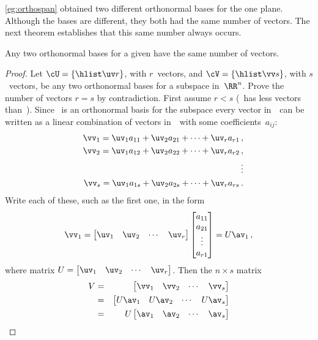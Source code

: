 \autoref{eg:orthospan} obtained two different orthonormal bases for the one plane.  
Although the bases are different, they both had the same number of vectors.
The next theorem establishes that this same number always occurs.

\begin{theorem} \label{thm:sameD} 
Any two orthonormal bases for a given  have the same number of vectors.
\end{theorem}
\begin{proof} 
Let \(\cU=\{\hlist\uv r\}\), with \(r\)~vectors, and \(\cV=\{\hlist\vv s\}\), with \(s\)~vectors, be any two orthonormal bases for a subspace in~\(\RR^n\).
Prove the number of vectors \(r=s\) by contradiction.
First assume \(r<s\) (\cU\ has less vectors than~\cV).
Since \cU\ is an orthonormal basis for the subspace every vector in~\cV\ can be written as a linear combination of vectors in~\cU\ with some coefficients~\(a_{ij}\):
\begin{eqnarray*}
  &&\vv_1=\uv_1a_{11}+\uv_2a_{21}+\cdots+\uv_ra_{r1}\,,
\\&&\vv_2=\uv_1a_{12}+\uv_2a_{22}+\cdots+\uv_ra_{r2}\,,
\\&&\qquad\vdots
\\&&\vv_s=\uv_1a_{1s}+\uv_2a_{2s}+\cdots+\uv_ra_{rs}\,.
\end{eqnarray*}
Write each of these, such as the first one, in the form
\begin{equation*}
\vv_1=\begin{bmatrix} \uv_1&\uv_2&\cdots&\uv_r \end{bmatrix}
\begin{bmatrix} a_{11}\\a_{21}\\\vdots\\a_{r1} \end{bmatrix}
=U\av_1\,,
\end{equation*}
where matrix \(U=\begin{bmatrix} \uv_1&\uv_2&\cdots&\uv_r \end{bmatrix}\).
Then the \(n\times s\) matrix
\begin{eqnarray*}
V&=&\begin{bmatrix} \vv_1&\vv_2&\cdots&\vv_s \end{bmatrix}
\\&=&\begin{bmatrix} U\av_1& U\av_2&\cdots&U\av_s\end{bmatrix}
\\&=&U\begin{bmatrix} \av_1& \av_2&\cdots&\av_s\end{bmatrix}

\end{eqnarray*}
\end{proof}
